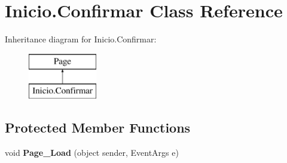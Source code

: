 \hypertarget{class_inicio_1_1_confirmar}{}\section{Inicio.\+Confirmar Class Reference}
\label{class_inicio_1_1_confirmar}
Inheritance diagram for Inicio.\+Confirmar\+:\begin{figure}[H]
\begin{center}
\leavevmode
\includegraphics[height=2.000000cm]{class_inicio_1_1_confirmar}
\end{center}
\end{figure}
\subsection*{Protected Member Functions}
\begin{DoxyCompactItemize}
\item 
\mbox{\label{class_inicio_1_1_confirmar_a47f2d7d6e91b4e672a1b954710c65daf}} 
void {\bfseries Page\+\_\+\+Load} (object sender, Event\+Args e)
\end{DoxyCompactItemize}
